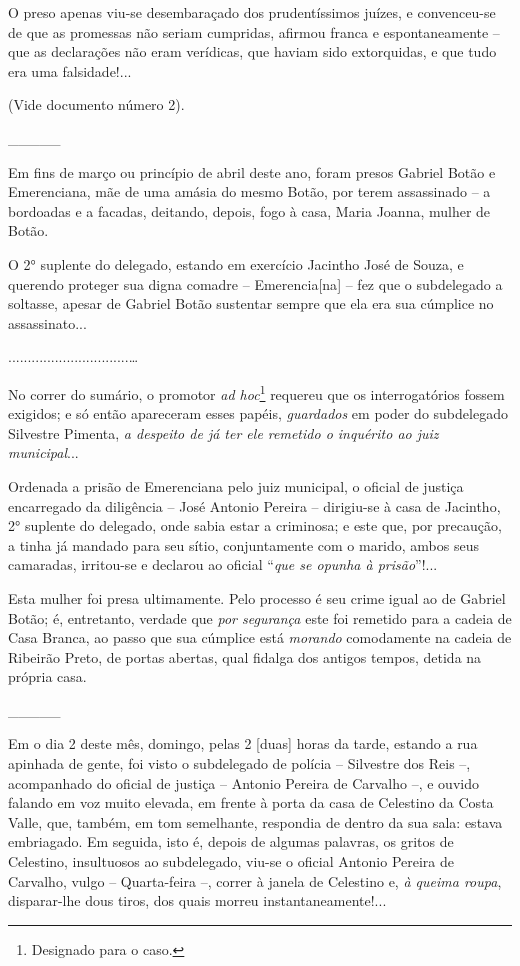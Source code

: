 O preso apenas viu-se desembaraçado dos prudentíssimos juízes, e
convenceu-se de que as promessas não seriam cumpridas, afirmou franca e
espontaneamente -- que as declarações não eram verídicas, que haviam
sido extorquidas, e que tudo era uma falsidade!...

(Vide documento número 2).

\_\_\_\_\_

Em fins de março ou princípio de abril deste ano, foram presos Gabriel
Botão e Emerenciana, mãe de uma amásia do mesmo Botão, por terem
assassinado -- a bordoadas e a facadas, deitando, depois, fogo à casa,
Maria Joanna, mulher de Botão.

O 2° suplente do delegado, estando em exercício Jacintho José de Souza,
e querendo proteger sua digna comadre -- Emerencia{[}na{]} -- fez que o
subdelegado a soltasse, apesar de Gabriel Botão sustentar sempre que ela
era sua cúmplice no assassinato...

...............................\ldots{}

No correr do sumário, o promotor \emph{ad hoc}\footnote{ Designado para
  o caso.} requereu que os interrogatórios fossem exigidos; e só então
apareceram esses papéis, \emph{guardados} em poder do subdelegado
Silvestre Pimenta, \emph{a despeito de já ter ele remetido o inquérito
ao juiz municipal}...

Ordenada a prisão de Emerenciana pelo juiz municipal, o oficial de
justiça encarregado da diligência -- José Antonio Pereira -- dirigiu-se
à casa de Jacintho, 2° suplente do delegado, onde sabia estar a
criminosa; e este que, por precaução, a tinha já mandado para seu sítio,
conjuntamente com o marido, ambos seus camaradas, irritou-se e declarou
ao oficial ``\emph{que se opunha à prisão}''!...

Esta mulher foi presa ultimamente. Pelo processo é seu crime igual ao de
Gabriel Botão; é, entretanto, verdade que \emph{por segurança} este foi
remetido para a cadeia de Casa Branca, ao passo que sua cúmplice está
\emph{morando} comodamente na cadeia de Ribeirão Preto, de portas
abertas, qual fidalga dos antigos tempos, detida na própria casa.

\_\_\_\_\_

Em o dia 2 deste mês, domingo, pelas 2 {[}duas{]} horas da tarde,
estando a rua apinhada de gente, foi visto o subdelegado de polícia --
Silvestre dos Reis --, acompanhado do oficial de justiça -- Antonio
Pereira de Carvalho --, e ouvido falando em voz muito elevada, em frente
à porta da casa de Celestino da Costa Valle, que, também, em tom
semelhante, respondia de dentro da sua sala: estava embriagado. Em
seguida, isto é, depois de algumas palavras, os gritos de Celestino,
insultuosos ao subdelegado, viu-se o oficial Antonio Pereira de
Carvalho, vulgo -- Quarta-feira --, correr à janela de Celestino e,
\emph{à queima roupa}, disparar-lhe dous tiros, dos quais morreu
instantaneamente!...

